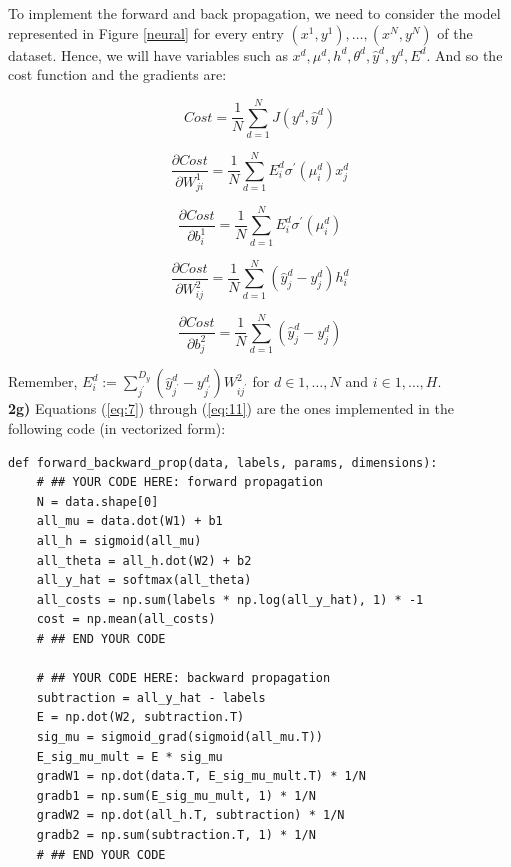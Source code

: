 \documentclass{article}
\begin{document}
To implement the forward and back propagation, we need to consider the model represented in Figure \ref{neural} for every entry $(x^{1},y^{1}), \dots ,(x^{N},y^{N})$ of the dataset. Hence, we will have variables such as $x^{d},\mu^{d},h^{d},\theta^{d},\hat{y}^{d},y^{d},E^{d}$. And so the cost function and the gradients are:

\begin{equation}\label{eq:7}
Cost = \frac{1}{N}\sum_{d=1}^{N}J(y^{d},\hat{y}^{d})
\end{equation}

\begin{equation}\label{eq:8}
\frac{\partial Cost}{\partial W^{1}_{ji}} = \frac{1}{N}\sum_{d=1}^{N}E^{d}_{i}\sigma^{\prime}(\mu^{d}_{i})x^{d}_{j}
\end{equation}

\begin{equation}\label{eq:9}
\frac{\partial Cost}{\partial b^{1}_{i}} = \frac{1}{N}\sum_{d=1}^{N}E^{d}_{i}\sigma^{\prime}(\mu^{d}_{i})
\end{equation}

\begin{equation}\label{eq:10}
\frac{\partial Cost}{\partial W^{2}_{ij}} = \frac{1}{N}\sum_{d=1}^{N}(\hat{y}^{d}_{j} - y^{d}_{j})h^{d}_{i}
\end{equation}

\begin{equation}\label{eq:11}
\frac{\partial Cost}{\partial b^{2}_{j}} = \frac{1}{N}\sum_{d=1}^{N}(\hat{y}^{d}_{j} - y^{d}_{j})
\end{equation}



Remember, $E^{d}_{i} := \sum_{j^{\prime}}^{D_{y}}(\hat{y}^{d}_{j^{\prime}} - y^{d}_{j^{\prime}})W^{2}_{ij^{\prime}}$ for $ d \in {1,\dots,N}$ and $i \in {1,\dots,H}$. \\


\textbf{2g)} Equations (\ref{eq:7}) through (\ref{eq:11}) are the ones implemented in the following code (in vectorized form):

\begin{verbatim}
def forward_backward_prop(data, labels, params, dimensions):
    # ## YOUR CODE HERE: forward propagation
    N = data.shape[0]
    all_mu = data.dot(W1) + b1
    all_h = sigmoid(all_mu)
    all_theta = all_h.dot(W2) + b2
    all_y_hat = softmax(all_theta)
    all_costs = np.sum(labels * np.log(all_y_hat), 1) * -1
    cost = np.mean(all_costs)
    # ## END YOUR CODE

    # ## YOUR CODE HERE: backward propagation
    subtraction = all_y_hat - labels
    E = np.dot(W2, subtraction.T)
    sig_mu = sigmoid_grad(sigmoid(all_mu.T))
    E_sig_mu_mult = E * sig_mu
    gradW1 = np.dot(data.T, E_sig_mu_mult.T) * 1/N
    gradb1 = np.sum(E_sig_mu_mult, 1) * 1/N
    gradW2 = np.dot(all_h.T, subtraction) * 1/N
    gradb2 = np.sum(subtraction.T, 1) * 1/N
    # ## END YOUR CODE
\end{verbatim}
\end{document}
